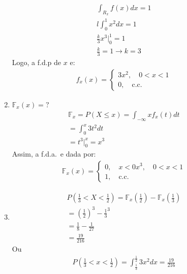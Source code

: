 \documentclass[11pt,a4paper]{book}
\begin{document}
\begin{description}
\begin{enumerate}[label=(\alph*)]
         \begin{align*}
           \int_{R_x} f(x) dx =1 \\
           l \int_{0}^{1} x^2 dx = 1 \\
           \frac{k}{3} x^3 |^{1}_{0} = 1 \\
           \frac{k}{3}=1 \to k=3
         \end{align*}
         Logo, a f.d.p de $x$ e:
         \begin{align*}
           f_x(x)= \begin{cases}
             3x^2, \quad 0<x<1 \\
             0 , \quad \text{c.c.\ }
           \end{cases}
         \end{align*}
       \item  $\mathbb{F}_{x} (x)= ?$
         \begin{align*}
           \mathbb{F}_{x}= P(X \leq x)= \int_{-\infty}{x} f_{x} (t) dt \\
           = \int_{0}^{x} 3 t^2 dt\\
           = t^3 |^{x}_{0}= x^3
         \end{align*}
         Assim, a f.d.a.\ e dada por:
         \begin{align*}
           \mathbb{F}_x(x)= \begin{cases}
             0 , \quad  x<0
             x^3, \quad 0<x<1 \\
             1 , \quad \text{c.c.\ }
           \end{cases}
         \end{align*}
       \item 
         \begin{align*}
           P( \frac{1}{3}< X < \frac{1}{2} )= \mathbb{F}_{x}(\frac{1}{2} )- \mathbb{F}_{x}(\frac{1}{3})\\
           = (\frac{1}{2})^3 - \frac{1}{3}^3 \\
           = \frac{1}{8} - \frac{1}{27}\\
           = \frac{19}{216}
         \end{align*}
         Ou 
         \begin{align*}
           P( \frac{1}{3}< x < \frac{1}{2} )= \int_{\frac{1}{3}}^{\frac{1}{2}} 3x^2 dx = \frac{19}{216}
         \end{align*}
     \end{enumerate}

\end{description}
\end{document}
